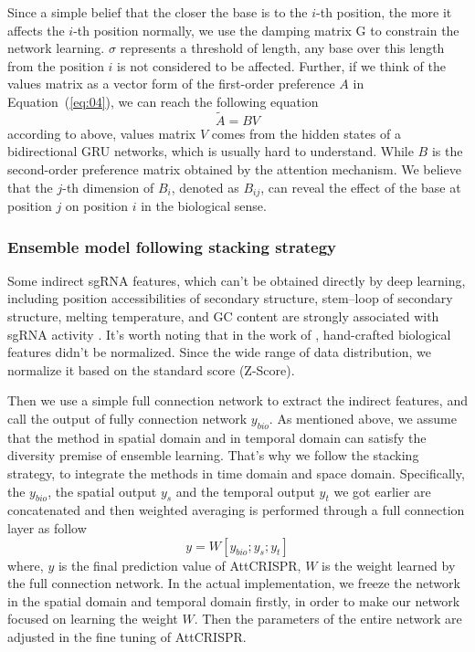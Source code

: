 \documentclass{bioinfo}
\begin{document}
Since a simple belief that the closer the base is to the $i$-th position, the more it affects the $i$-th position normally, we use the damping matrix G to constrain the network learning. 
$\sigma$ represents a threshold of length, any base over this length from the position $i$ is not considered to be affected.
Further, if we think of the values matrix as a vector form of the first-order preference $A$ in Equation~(\ref{eq:04}), we can reach the following equation
\begin{equation}
\tilde{A}=BV\label{eq:19}
\end{equation}
according to above, values matrix $V$ comes from the hidden states of a bidirectional GRU networks, which is usually hard to understand.
While $B$ is the second-order preference matrix obtained by the attention mechanism. 
We believe that the $j$-th dimension of $B_i$, denoted as $B_{ij}$, can reveal the effect of the base at position $j$ on position $i$ in the biological sense. 

\subsubsection{Ensemble model following stacking strategy}

Some indirect sgRNA features, which can't be obtained directly by deep learning, 
including position accessibilities of secondary structure, stem–loop of secondary structure, melting temperature, 
and GC content are strongly associated with sgRNA activity \citep{Wang2016ProteinSS,wang2019optimized}. 
It's worth noting that in the work of \citeauthor{wang2019optimized}, hand-crafted biological features didn't be normalized. 
Since the wide range of data distribution, we normalize it based on the standard score (Z-Score).

Then we use a simple full connection network to extract the indirect features, and call the output of fully connection network $y_{bio}$. 
As mentioned above, we assume that the method in spatial domain and in temporal domain can satisfy the diversity premise of ensemble learning.
That's why we follow the stacking strategy, to integrate the methods in time domain and space domain. 
Specifically, the $y_{bio}$, the spatial output $y_{s}$ and the temporal output $y_{t}$ we got earlier are concatenated and then weighted averaging is performed through a full connection layer as follow
\begin{equation}
y=W[y_{bio};y_s;y_t]\label{eq:20}
\end{equation}
where, $y$ is the final prediction value of AttCRISPR, $W$ is the weight learned by the full connection network. 
In the actual implementation, we freeze the network in the spatial domain and temporal domain firstly, in order to make our network focused on learning the weight $W$.
Then the parameters of the entire network are adjusted in the fine tuning of AttCRISPR.
\end{document}

